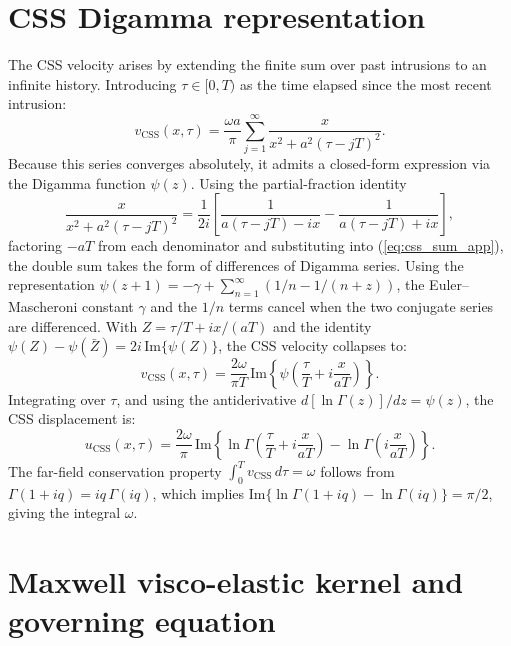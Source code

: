 \documentclass[12pt]{article}
\newcommand{\IM}{\mathrm{Im}}
\begin{document}
\section{CSS Digamma representation}
\label{app:digamma}

The CSS velocity arises by extending the finite sum over past intrusions to
an infinite history. Introducing $\tau\in[0,T)$ as the time elapsed since the
most recent intrusion:
\begin{equation}
v_{\text{CSS}}(x,\tau) = \frac{\omega a}{\pi}
  \sum_{j=1}^{\infty}\frac{x}{x^2 + a^2(\tau-jT)^2}.
\label{eq:css_sum_app}
\end{equation}
Because this series converges absolutely, it admits a closed-form expression
via the Digamma function $\psi(z)$. Using the partial-fraction identity
\begin{equation*}
\frac{x}{x^2+a^2(\tau-jT)^2}
= \frac{1}{2i}\!\left[
    \frac{1}{a(\tau-jT)-ix} - \frac{1}{a(\tau-jT)+ix}
  \right],
\end{equation*}
factoring $-aT$ from each denominator and substituting into
(\ref{eq:css_sum_app}), the double sum takes the form of differences of Digamma
series. Using the representation $\psi(z+1) = -\gamma +
\sum_{n=1}^\infty(1/n - 1/(n+z))$, the Euler--Mascheroni constant $\gamma$ and
the $1/n$ terms cancel when the two conjugate series are differenced. With
$Z = \tau/T + ix/(aT)$ and the identity
$\psi(Z)-\psi(\bar{Z}) = 2i\,\IM\{\psi(Z)\}$,
the CSS velocity collapses to:
\begin{equation}
v_{\text{CSS}}(x,\tau) =
  \frac{2\omega}{\pi T}\,\IM\!\left\{
    \psi\!\left(\frac{\tau}{T}+i\frac{x}{aT}\right)
  \right\}.
\end{equation}
Integrating over $\tau$, and using the antiderivative
$d[\ln\Gamma(z)]/dz = \psi(z)$, the CSS displacement is:
\begin{equation}
u_{\text{CSS}}(x,\tau) =
  \frac{2\omega}{\pi}\,\IM\!\left\{
    \ln\Gamma\!\left(\frac{\tau}{T}+i\frac{x}{aT}\right)
    -\ln\Gamma\!\left(i\frac{x}{aT}\right)
  \right\}.
\end{equation}
The far-field conservation property $\int_0^T v_{\text{CSS}}\,d\tau = \omega$
follows from $\Gamma(1+iq) = iq\,\Gamma(iq)$, which implies
$\IM\{\ln\Gamma(1+iq)-\ln\Gamma(iq)\} = \pi/2$, giving the integral $\omega$.

\section{Maxwell visco-elastic kernel and governing equation}
\label{app:maxwell}
\end{document}
